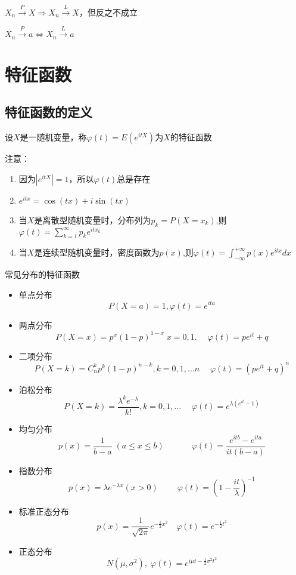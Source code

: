\begin{theorem}
    ${X_n}\mathop  \to \limits^P X \Rightarrow {X_n}\mathop  \to \limits^L X$，但反之不成立
\end{theorem}

\begin{theorem}
    ${X_n}\mathop  \to \limits^P a \Leftrightarrow {X_n}\mathop  \to \limits^L a$
\end{theorem}

\section{特征函数}
\subsection{特征函数的定义}

\begin{definition}
    设$X$是一随机变量，称$\varphi (t) = E(e^{itX})$为$X$的特征函数
\end{definition}

注意：
\begin{enumerate}
    \item 因为$|e^{itX}|=1$，所以$\varphi (t)$总是存在
    \item ${e^{itx}} = \cos (tx) + i\sin (tx)$
    \item 当$X$是离散型随机变量时，分布列为${p_k} = P(X = {x_k})$,则$\varphi (t) = \sum\limits_{k = 1}^\infty  {{p_k}{e^{it{x_k}}}} $
    \item 当$X$是连续型随机变量时，密度函数为$p(x)$,则$\varphi (t) = \int_{ - \infty }^{ + \infty } {{p(x){e^{itx}}} dx} $
\end{enumerate}

常见分布的特征函数
\begin{itemize}
    \item 单点分布
          $$P(X = a) = 1,\varphi (t) = {e^{ita}}$$
    \item 两点分布
          $$P(X = x) = {p^x}{(1 - p)^{1 - x}}\;x = 0,1.\;\quad \varphi (t) = p{e^{it}} + q$$
    \item 二项分布
          $$P(X = k) = C_n^k{p^k}{(1 - p)^{n - k}},k = 0,1,...n\quad \;\varphi (t) = {(p{e^{it}} + q)^n}$$
    \item 泊松分布
          $$P(X = k) = \frac{{{\lambda ^k}{e^{ - \lambda }}}}{{k!}},k = 0,1,...\quad \;\varphi (t) = {e^{\lambda ({e^{it}} - 1)}}$$
    \item 均匀分布
          $$p(x) = \frac{1}{{b - a}}\;(a \leqslant x \leqslant b)\quad \;\quad \quad \varphi (t) = \frac{{{e^{itb}} - {e^{ita}}}}{{it(b - a)}}$$
    \item 指数分布
          $$p(x) = \lambda {e^{ - \lambda x}}(x > 0)\quad \;\quad \varphi (t) = {(1 - \frac{{it}}{\lambda })^{ - 1}}$$
    \item 标准正态分布
          $$p(x) = \frac{1}{{\sqrt {2\pi } }}{e^{ - \frac{1}{2}{x^2}}}\quad \varphi (t) = {e^{ - \frac{1}{2}{t^2}}}$$
    \item 正态分布
          $$N(\mu ,{\sigma ^2}),\;\varphi (t) = {e^{i\mu t - \frac{1}{2}{\sigma ^2}{t^2}}}$$

\end{itemize}

